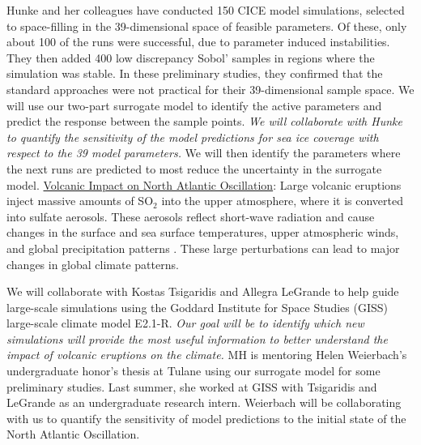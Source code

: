 \documentclass[11pt]{NSFamsart}
\newcommand{\Upara}[1]{\noindent\underline{\upshape #1}:}
\begin{document}
Hunke and her colleagues have conducted 150 CICE model simulations, selected to space-filling in the 39-dimensional space of feasible parameters. 
Of these, only about 100 of the runs were successful, due to parameter induced instabilities. They then added 400 low discrepancy Sobol' samples in regions where the simulation was stable. In these preliminary studies, they confirmed that the standard approaches \cite{bengio2006curse, o2010oxford} were not practical for their 39-dimensional sample space. We will use our two-part surrogate model to identify the active parameters \cite{constantine2014active} and predict the response between the sample points. 
\emph{We will collaborate with Hunke to quantify the sensitivity of the model predictions for sea ice coverage with respect to the 39 model parameters.} We will then identify the parameters where the next runs are predicted to most reduce the uncertainty in the surrogate model.
\Upara{Volcanic Impact on North Atlantic Oscillation}
Large volcanic eruptions inject massive amounts of SO${}_2$ into the upper atmosphere, where it is converted into sulfate aerosols. These aerosols reflect short-wave radiation and cause changes in the surface and sea surface temperatures, upper atmospheric winds, and global precipitation patterns \cite{zanchettin2013background, legrande2015volcanic,zanchettin2016model}. 
These large perturbations can lead to major changes in global climate patterns.

We will collaborate with Kostas Tsigaridis and Allegra LeGrande to help guide large-scale simulations using the Goddard Institute for Space Studies (GISS) large-scale climate model E2.1-R. \emph{Our goal will be to identify which new simulations will provide the most useful information to better understand the impact of volcanic eruptions on the climate.} MH is mentoring Helen Weierbach's undergraduate honor's thesis at Tulane using our surrogate model for some preliminary studies. Last summer, she worked at GISS with Tsigaridis and LeGrande as an undergraduate research intern. Weierbach will be collaborating with us to quantify the sensitivity of model predictions to the initial state of the North Atlantic Oscillation. 
\end{document}
